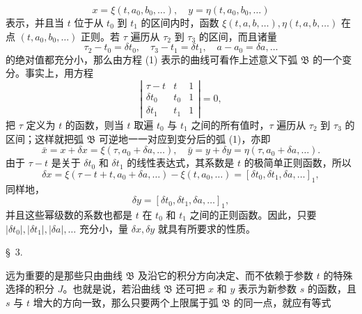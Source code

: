 \documentclass[11pt,a4paper,leqno]{article}
\begin{document}
\[
 x=\xi(t,a_0,b_0,\ldots),\quad y=\eta(t,a_0,b_0,\ldots)
\]
表示，并且当 $t$ 位于从 $t_0$ 到 $t_1$ 的区间内时，函数 $\xi(t,a,b,\ldots),\eta(t,a,b,\ldots)$ 在点 $(t,a_0,b_0,\ldots)$ 正则。若 $\tau$ 遍历从 $\tau_2$ 到 $\tau_3$ 的区间，而且诸量
\[
 \tau_2-t_0=\delta t_0,\quad \tau_3-t_1=\delta t_1,\quad a-a_0=\delta a,\ldots
\]
的绝对值都充分小，那么由方程 (1) 表示的曲线可看作上述意义下弧 $\mathfrak{B}$ 的一个变分。事实上，用方程
\[
 \left|\begin{array}{ccc}
 \tau-t & t & 1\\
 \delta t_0 & t_0 & 1\\
 \delta t_1 & t_1 & 1
 \end{array}\right|=0,
\]
把 $\tau$ 定义为 $t$ 的函数，则当 $t$ 取遍 $t_0$ 与 $t_1$ 之间的所有值时，$\tau$ 遍历从 $\tau_2$ 到 $\tau_3$ 的区间；这样就把弧 $\mathfrak{B}$ 可逆地一一对应到变分后的弧 (1)，亦即
\[
 \bar{x}=x+\delta x=\xi(\tau,a_0+\delta a,\ldots),\quad
 \bar{y}=y+\delta y=\eta(\tau,a_0+\delta a,\ldots).
\]
由于 $\tau-t$ 是关于 $\delta t_0$ 和 $\delta t_1$ 的线性表达式，其系数是 $t$ 的极简单正则函数，所以
\[
 \delta x=\xi(\tau-t+t,a_0+\delta a,\ldots)-\xi(t,a_0,\ldots)=[\delta t_0,\delta t_1,\delta a,\ldots]_1,
\]
同样地，
\[
 \delta y=[\delta t_0,\delta t_1,\delta a,\ldots]_1,
\]
并且这些幂级数的系数也都是 $t$ 在 $t_0$ 和 $t_1$ 之间的正则函数。因此，只要 $|\delta t_0|,|\delta t_1|,|\delta a|,\ldots$ 充分小，量 $\delta x,\delta y$ 就具有所要求的性质。

\begin{center}{\large \S~3.}\end{center}

远为重要的是那些只由曲线 $\mathfrak{B}$ 及沿它的积分方向决定、而不依赖于参数 $t$ 的特殊选择的积分 $J$。也就是说，若沿曲线 $\mathfrak{B}$ 还可把 $x$ 和 $y$ 表示为新参数 $s$ 的函数，且 $s$ 与 $t$ 增大的方向一致，那么只要两个上限属于弧 $\mathfrak{B}$ 的同一点，就应有等式
\end{document}
